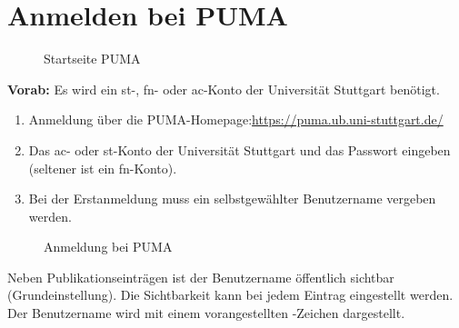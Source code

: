 \section{Anmelden bei PUMA} 
\begin{figure}[h!]
 \centering
 \caption{Startseite PUMA}
 \label{figure001}
\end{figure}
\textbf{Vorab:} Es wird ein st-, fn- oder ac-Konto der Universität Stuttgart benötigt.
\begin{enumerate}
    \item Anmeldung über die PUMA-Homepage:\newline \url{https://puma.ub.uni-stuttgart.de/}
    \item Das ac- oder st-Konto der Universität Stuttgart und das Passwort eingeben (seltener ist ein fn-Konto).  
    \item Bei der Erstanmeldung muss ein selbstgewählter Benutzername vergeben werden.
\end{enumerate}
 \begin{figure}[h!]
 \centering
 \caption{Anmeldung bei PUMA}
 \label{figure002}
\end{figure} 
Neben Publikationseinträgen ist der Benutzername öffentlich sichtbar (Grundeinstellung). Die Sichtbarkeit kann bei jedem Eintrag eingestellt werden. Der Benutzername wird mit einem vorangestellten \@-Zeichen dargestellt.
